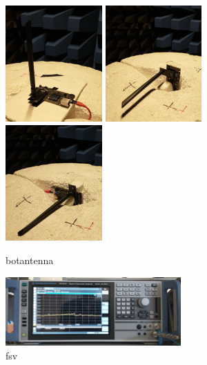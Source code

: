 \documentclass[a4paper,12pt,titlepage]{article}
\begin{document}
            \begin{figure}
                \centering
                \includegraphics[width=0.33\textwidth]{kep/szerkesztett/botantenna_XY.jpg}
                \includegraphics[width=0.33\textwidth]{kep/szerkesztett/botantenna_XZ.jpg}
                \includegraphics[width=0.33\textwidth]{kep/szerkesztett/botantenna_YZ.jpg}
                \caption{botantenna}
                \label{fig:botantenna}
            \end{figure}

            \begin{figure}
                \centering
                \includegraphics[width=0.6\textwidth]{kep/szerkesztett/fsv.jpg}
                \caption{fsv}
                \label{fig:fsv}
            \end{figure}
\end{document}
